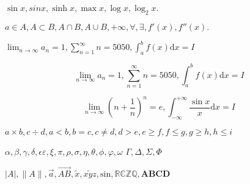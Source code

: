 \documentclass{article}
\begin{document}
    $\sin x, sin x, \sinh x, \max x, \log x, \log_2 x.$
    
    $a \in A, A \subset B, A \cap B, A \cup B, +\infty, \forall, \exists, f'(x),f''(x).$
    
    $\lim_{n \to\infty} a_n = 1, \sum_{n=1}^{\infty} n = 5050, \int_{a}^{b}f(x) \mathrm{d} x = I$
    
    $$\lim_{n \to\infty} a_n = 1, \sum_{n=1}^{\infty} n = 5050, \int_{a}^{b}f(x) \mathrm{d} x = I$$
    
    $$\lim_{n \to \infty} (n + \frac{1}{n})^n = e, \int_{-\infty}^{+\infty} \frac{\sin x}{x} \mathrm{d} x = I$$
    
    $a \times b, c \div d, a < b, b = c, c \neq d, d > e, e \geq f, f \leq g, g \geqslant h, h \leqslant i$ 
    
    $ \alpha,\beta,\gamma,\delta, \epsilon \varepsilon, \xi, \pi,\rho, \sigma, \eta, \theta, \phi, \varphi, \omega$
    $\Gamma, \Delta, \Sigma, \Phi$
    
    $|A|, \|A\|, \vec{a}, \overrightarrow{AB}, \tilde{x}, \widetilde{xyz}, \mathrm{sin}, \mathbb{RCZQ}, \mathbf{ABCD}$
    
\end{document}
